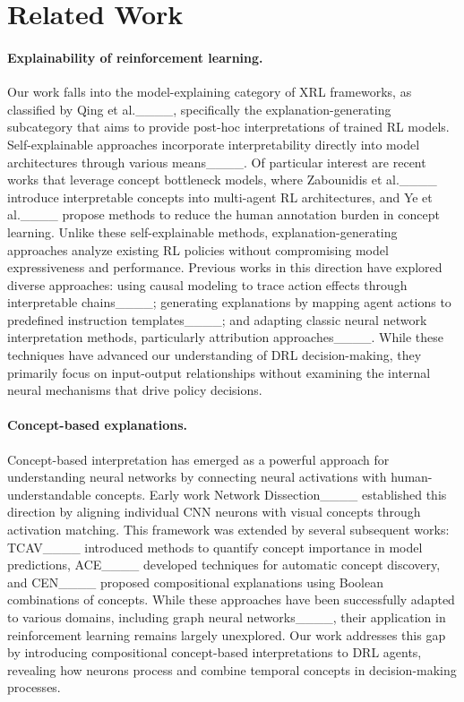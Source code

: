 \section{Related Work}
\paragraph{Explainability of reinforcement learning.} Our work falls into the model-explaining category of XRL frameworks, as classified by Qing et al.____, specifically the explanation-generating subcategory that aims to provide post-hoc interpretations of trained RL models. Self-explainable approaches incorporate interpretability directly into model architectures through various means____. Of particular interest are recent works that leverage concept bottleneck models, where Zabounidis et al.____ introduce interpretable concepts into multi-agent RL architectures, and Ye et al.____ propose methods to reduce the human annotation burden in concept learning. Unlike these self-explainable methods, explanation-generating approaches analyze existing RL policies without compromising model expressiveness and performance. Previous works in this direction have explored diverse approaches: using causal modeling to trace action effects through interpretable chains____; generating explanations by mapping agent actions to predefined instruction templates____; and adapting classic neural network interpretation methods, particularly attribution approaches____. While these techniques have advanced our understanding of DRL decision-making, they primarily focus on input-output relationships without examining the internal neural mechanisms that drive policy decisions.

\paragraph{Concept-based explanations.} Concept-based interpretation has emerged as a powerful approach for understanding neural networks by connecting neural activations with human-understandable concepts. Early work Network Dissection____ established this direction by aligning individual CNN neurons with visual concepts through activation matching. This framework was extended by several subsequent works: TCAV____ introduced methods to quantify concept importance in model predictions, ACE____ developed techniques for automatic concept discovery, and CEN____ proposed compositional explanations using Boolean combinations of concepts. While these approaches have been successfully adapted to various domains, including graph neural networks____, their application in reinforcement learning remains largely unexplored. Our work addresses this gap by introducing compositional concept-based interpretations to DRL agents, revealing how neurons process and combine temporal concepts in decision-making processes.